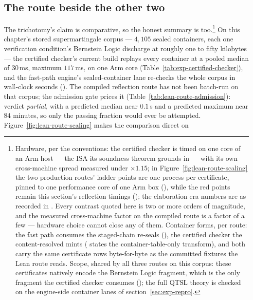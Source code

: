 \subsection{The route beside the other two}
\label{sec:exp-lean-route-comparison}

The trichotomy's claim is comparative, so the honest summary is
too.\footnote{Hardware, per the conventions: the certified checker is
timed on one core of an Arm host --- the ISA its soundness theorem
grounds in --- with its own cross-machine spread measured under
$\times 1.15$; in Figure~\ref{fig:lean-route-scaling} the two
production routes' ladder points are one process per certificate,
pinned to one performance core of one Arm box (\LeanRouteArmHost),
while the red points remain this section's reflection timings
(\LeanRouteHost); the elaboration-era numbers are as recorded in
. Every contrast quoted here is two or
more orders of magnitude, and the measured cross-machine factor on the
compiled route is a factor of a few --- hardware choice cannot close
any of them. Container forms, per route: the fast path consumes the
staged-chain re-seals (), the certified
checker the content-resolved mints
( states the
container-table-only transform), and both carry the same certificate
rows byte-for-byte as the committed fixtures the Lean route reads.
Scope, shared by all three routes on this corpus: these
certificates natively encode the Bernstein Logic fragment, which is
the only fragment the certified checker consumes
(); the full QTSL theory is
checked on the engine-side container lanes of
section~\ref{sec:exp-repro}.} On this chapter's stored supermartingale corpus ---
$4{,}105$ sealed containers, each one verification condition's
Bernstein Logic discharge at roughly one to fifty kilobytes --- the
certified checker's current build replays every container at a
pooled median of $30$\,ms, maximum $117$\,ms, on one Arm core
(Table~\ref{tab:exp-certified-checker}), and the fast-path engine's
sealed-container lane re-checks the whole corpus in wall-clock seconds
(). The compiled reflection route
has not been batch-run on that corpus; the admission gate prices it
(Table~\ref{tab:lean-route-admission}): verdict \emph{partial}, with a
predicted median near $0.1$\,s and a predicted maximum near $84$
minutes, so only the passing fraction would ever be attempted.
Figure~\ref{fig:lean-route-scaling} makes the comparison direct on
